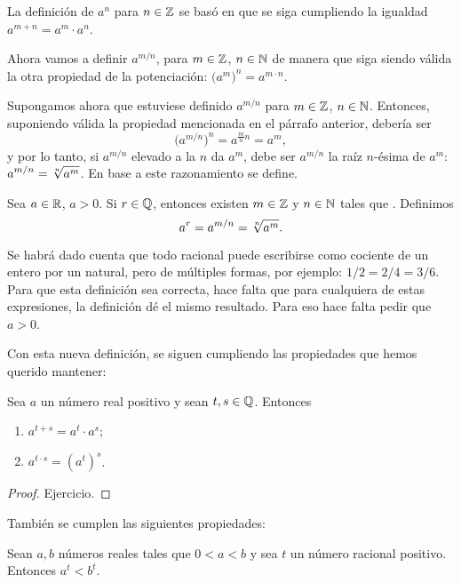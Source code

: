 La definición de $a^n$ para $n\in\mathbb{Z}$ se basó en que se siga cumpliendo la igualdad $a^{m+n}=a^m\cdot a^n$. 

Ahora vamos a definir $a^{m/n}$, para $m\in\mathbb{Z}$, $n\in\mathbb{N}$ de manera que siga siendo válida la otra propiedad de la potenciación: $\big(a^m\big)^n = a^{m\cdot n}$.

Supongamos ahora que estuviese definido $a^{m/n}$ para $m\in\mathbb{Z}$, $n\in\mathbb{N}$. Entonces, suponiendo válida la propiedad mencionada en el párrafo anterior, debería ser
\[
    \big(a^{m/n}\big)^n = a^{\frac mn n} = a^m,
\]
y por lo tanto, si $a^{m/n}$ elevado a la $n$ da $a^m$, debe ser $a^{m/n}$ la raíz $n$-ésima de $a^m$: $\displaystyle a^{m/n} = \sqrt[n]{a^m}$. En base a este razonamiento se define.

\begin{definition}
    Sea $a\in\mathbb{R}$, $a>0$. Si $r \in \mathbb{Q}$, entonces 
    existen $m\in\mathbb{Z}$ y $n\in\mathbb{N}$ tales que . Definimos
    \[
        {a^r} = a^{m/n} = \sqrt[n]{a^m}.
    \]
\end{definition}

Se habrá dado cuenta que todo racional puede escribirse como cociente de un entero por un natural, pero de múltiples formas, por ejemplo: $1/2 = 2/4 = 3/6$. Para que esta definición sea correcta, hace falta que para cualquiera de estas expresiones, la definición dé el mismo resultado. Para eso hace falta pedir que $a>0$.

Con esta nueva definición, se siguen cumpliendo las propiedades que hemos querido mantener:

\begin{proposition}
    Sea $a$ un número real positivo y sean $t,s\in\mathbb{Q}$. Entonces
    \begin{enumerate}[{\rm (i)}]
        \item $a^{t+s} = a^t \cdot a^s$;
        \item $a^{t\cdot s} = (a^t)^s$.
    \end{enumerate}
\end{proposition}

\begin{proof}
    Ejercicio.
\end{proof}

También se cumplen las siguientes propiedades:

\begin{proposition}\label{P:potencia-monotona}
    Sean $a,b$ números reales tales que $0<a<b$ y sea $t$ un número racional positivo. Entonces $a^t < b^t$.
\end{proposition}

